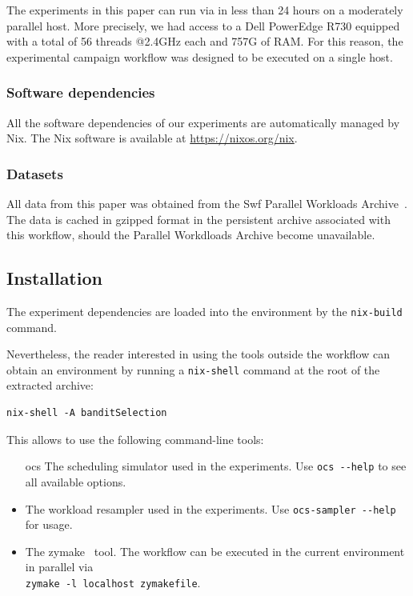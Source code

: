 \documentclass[sigconf,anonymous]{acmart}
\begin{document}
 The experiments in this paper can run via in less than 24 hours on a
 moderately parallel host. More precisely, we had access to a Dell PowerEdge
 R730 equipped with a total of 56 threads @2.4GHz each and 757G of RAM. For
 this reason, the experimental campaign workflow was designed to be executed on
 a single host.

\subsubsection{Software dependencies}

All the software dependencies of our experiments are automatically managed by Nix.
The Nix software is available at \url{https://nixos.org/nix}.

\subsubsection{Datasets}

All data from this paper was obtained from the Swf Parallel Workloads
Archive~\cite{Feitelson20142967}. The data is cached in gzipped format in the
persistent archive associated with this workflow, should the Parallel
Workdloads Archive become unavailable.

\subsection{Installation}

The experiment dependencies are loaded into the environment by the
\lstinline[basicstyle=\ttfamily]|nix-build| command.

Nevertheless, the reader interested in using the tools outside the workflow can
obtain an environment by running a \lstinline[basicstyle=\ttfamily]|nix-shell| command
at the root of the extracted archive:

\begin{lstlisting}
nix-shell -A banditSelection
\end{lstlisting}

This allows to use the following command-line tools:

\begin{itemize}

  \item[ocs] The scheduling simulator used in the experiments. Use
    \lstinline[basicstyle=\ttfamily]|ocs --help| to see all available options.

  \item[ocs-sampler] The workload resampler used in the experiments. Use
    \lstinline[basicstyle=\ttfamily]|ocs-sampler --help| for usage.

  \item[zymake] The zymake~\cite{zymake} tool.
    The workflow can be executed in the current environment in parallel
    via \\ \lstinline[basicstyle=\ttfamily]|zymake -l localhost zymakefile|.

\end{itemize}
\end{document}
